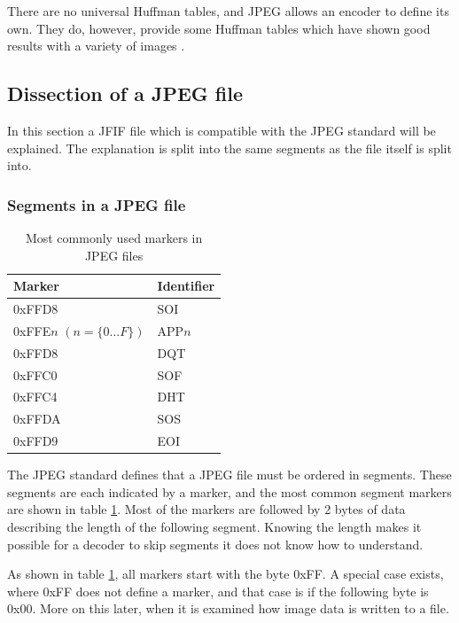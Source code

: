 \begin{infobox}
There are no universal Huffman tables, and JPEG allows an encoder to define its own. They do, however, provide some Huffman tables which have shown good results with a variety of images \citep[p. 153]{JPEGStandard}. 

\vspace{4mm}
\subsection{Dissection of a JPEG file}
\vspace{-2.5mm}
In this section a JFIF file which is compatible with the JPEG standard will be explained. The explanation is split into the same segments as the file itself is split into.
\newpage
\subsubsection{Segments in a JPEG file}
\begin{table}
\caption{Most commonly used markers in JPEG files}
\label{tab:markers}
\begin{tabular}{|p{2.7cm}|l|}
\hline
Marker & Identifier\\ \hline
0xFFD8 & SOI\\ \hline
0xFFE$n$ \newline$(n = \{0 \ldots F\})$ & APP$n$\\ \hline
0xFFD8 & DQT \\ \hline
0xFFC0 & SOF \\ \hline
0xFFC4 & DHT\\ \hline
0xFFDA & SOS\\ \hline
0xFFD9 & EOI\\ \hline 
\end{tabular}
\end{table}

The JPEG standard defines that a JPEG file must be ordered in segments.
These segments are each indicated by a marker, and the most common segment markers are shown in table \ref{tab:markers}.
Most of the markers are followed by 2 bytes of data describing the length of the following segment.
Knowing the length makes it possible for a decoder to skip segments it does not know how to understand. 

As shown in table \ref{tab:markers}, all markers start with the byte 0xFF.
A special case exists, where 0xFF does not define a marker, and that case is if the following byte is 0x00.
More on this later, when it is examined how image data is written to a file.


\end{infobox}
